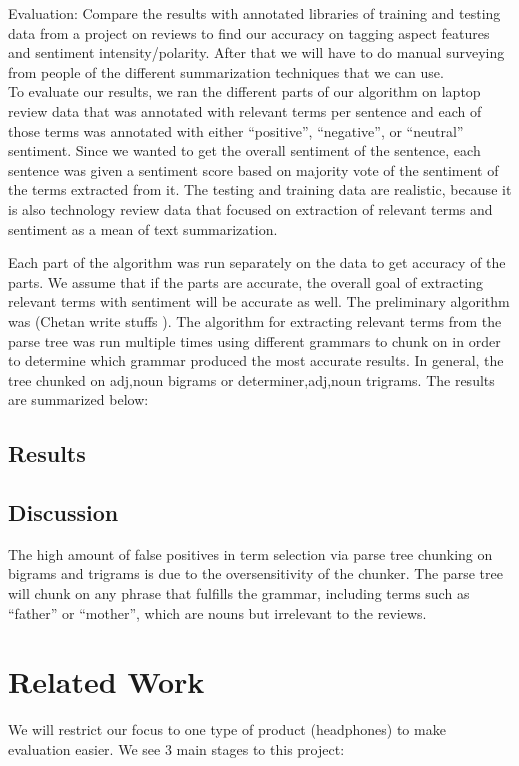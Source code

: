 \documentclass{article}
\begin{document}
Evaluation: Compare the results with annotated libraries of training and testing data from a project on reviews to find our accuracy on tagging aspect features and sentiment intensity/polarity.
After that we will have to do manual surveying from people of the different summarization techniques that we can use.
\newline \\
To evaluate our results, we ran the different parts of our algorithm on laptop review data that was annotated with relevant terms per sentence and each of those terms was annotated with either “positive”, 
“negative”, or “neutral” sentiment. Since we wanted to get the overall sentiment of the sentence, each sentence was given a sentiment score based on majority vote of the sentiment of the terms extracted from it. The testing and training data are realistic, because it is also technology review data that focused on extraction of relevant terms and sentiment as a mean of text summarization.  

Each part of the algorithm was run separately on the data to get accuracy of the parts. We assume that if the parts are accurate, the overall goal of extracting relevant terms with sentiment will be accurate as well.
The preliminary algorithm was (Chetan write stuffs ). 
\newline 
The algorithm for extracting relevant terms from the parse tree was run multiple times using different grammars to chunk on in order to determine which grammar produced the most accurate results. In general, the tree chunked on adj,noun bigrams or determiner,adj,noun trigrams. The results are summarized below: 


\subsection{Results}
\subsection{Discussion}
The high amount of false positives in term selection via parse tree chunking on bigrams and trigrams is due to the oversensitivity of the chunker. The parse tree will chunk on any phrase that fulfills the grammar, including terms such as “father” or “mother”, which are nouns but irrelevant to the reviews.
\section{Related Work}
We will restrict our focus to one type of product (headphones) to make evaluation easier. We see 3 main stages to this project:
\end{document}
